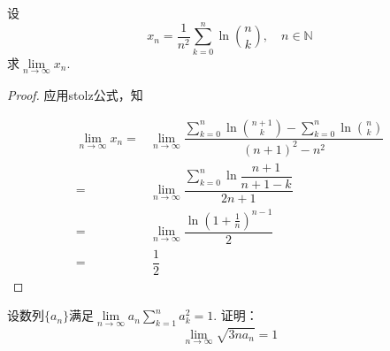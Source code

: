 \begin{proposition}
    
    设
    $$x_n = \dfrac{1}{n^2} \sum\limits_{k = 0}^{n}{\ln{\binom{n}{k}}}, \quad n \in \mathbb{N}$$
    求$\lim\limits_{n \to \infty}{x_n}$.

\end{proposition}

\begin{proof}
    
    应用\textup{stolz}公式，知

    \begin{align*}
        \lim\limits_{n \to \infty}{x_n}  = & \lim\limits_{n \to \infty}{\dfrac{\sum\limits_{k = 0}^{n}{\ln{\binom{n + 1}{k}}} - \sum\limits_{k = 0}^{n}{\ln{\binom{n}{k}}}}{(n + 1)^2 - n^2}} \\
        = & \lim\limits_{n \to \infty}{\dfrac{\sum\limits_{k = 0}^{n}{\ln{\dfrac{n + 1}{n + 1 - k}}}}{2n + 1}} \\
        = & \lim\limits_{n \to \infty}{\dfrac{\ln{(1 + \frac{1}{n})^{n - 1}}}{2}} \\
        = & \ \dfrac{1}{2}
    \end{align*}

\end{proof}

\begin{proposition}
    
    设数列$\{a_n\}$满足$\lim\limits_{n \to \infty}{a_n \sum\limits_{k  = 1}^{n}{a_k^2}} = 1$. 证明：
    $$\lim\limits_{n \to \infty}{\sqrt{3na_n}} = 1$$

\end{proposition}

